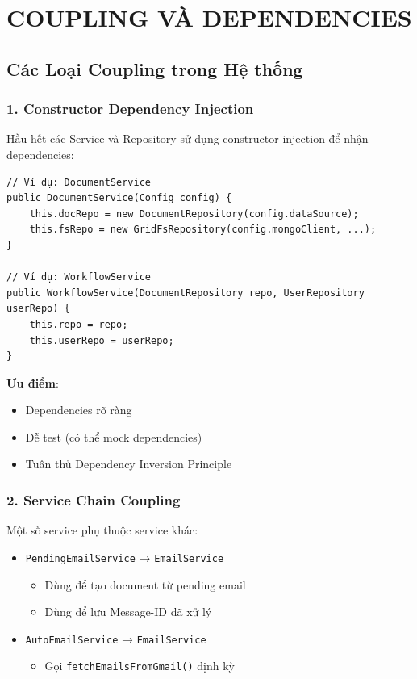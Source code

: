 \documentclass[12pt,a4paper]{article}
\begin{document}
\section{COUPLING VÀ DEPENDENCIES}

\subsection{Các Loại Coupling trong Hệ thống}

\subsubsection{1. Constructor Dependency Injection}
Hầu hết các Service và Repository sử dụng constructor injection để nhận dependencies:

\begin{lstlisting}
// Ví dụ: DocumentService
public DocumentService(Config config) {
    this.docRepo = new DocumentRepository(config.dataSource);
    this.fsRepo = new GridFsRepository(config.mongoClient, ...);
}

// Ví dụ: WorkflowService
public WorkflowService(DocumentRepository repo, UserRepository userRepo) {
    this.repo = repo;
    this.userRepo = userRepo;
}
\end{lstlisting}

\textbf{Ưu điểm}:
\begin{itemize}
    \item Dependencies rõ ràng
    \item Dễ test (có thể mock dependencies)
    \item Tuân thủ Dependency Inversion Principle
\end{itemize}

\subsubsection{2. Service Chain Coupling}
Một số service phụ thuộc service khác:

\begin{itemize}
    \item \texttt{PendingEmailService} → \texttt{EmailService}
    \begin{itemize}
        \item Dùng để tạo document từ pending email
        \item Dùng để lưu Message-ID đã xử lý
    \end{itemize}
    \item \texttt{AutoEmailService} → \texttt{EmailService}
    \begin{itemize}
        \item Gọi \texttt{fetchEmailsFromGmail()} định kỳ
    \end{itemize}
\end{itemize}
\end{document}
